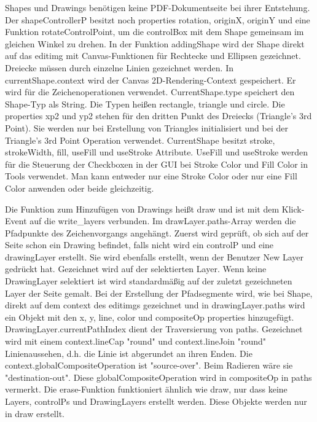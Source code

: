\par
Shapes und Drawings benötigen keine PDF-Dokumentseite bei ihrer Entstehung. Der shapeControllerP besitzt noch properties rotation, originX, originY und eine Funktion rotateControlPoint, um die controlBox mit dem Shape gemeinsam im gleichen Winkel zu drehen. In der Funktion addingShape wird der Shape direkt auf das editimg mit Canvas-Funktionen für Rechtecke und Ellipsen gezeichnet. Dreiecke müssen durch einzelne Linien gezeichnet werden. In currentShape.context wird der Canvas 2D-Rendering-Context gespeichert. Er wird für die Zeichenoperationen verwendet. CurrentShape.type speichert den Shape-Typ als String. Die Typen heißen rectangle, triangle und circle. Die properties xp2 und yp2 stehen für den dritten Punkt des Dreiecks (Triangle's 3rd Point). Sie werden nur bei Erstellung von Triangles initialisiert und bei der Triangle's 3rd Point Operation verwendet. CurrentShape besitzt stroke, strokeWidth, fill, useFill und useStroke Attribute. UseFill und useStroke werden für die Steuerung der Checkboxen in der GUI bei Stroke Color und Fill Color in Tools verwendet. Man kann entweder nur eine Stroke Color oder nur eine Fill Color anwenden oder beide gleichzeitig. 
\par 
Die Funktion zum Hinzufügen von Drawings heißt draw und ist mit dem Klick-Event auf die write\_layers verbunden. Im drawLayer.paths-Array werden die Pfadpunkte des Zeichenvorgangs angehängt. Zuerst wird geprüft, ob sich auf der Seite schon ein Drawing befindet, falls nicht wird ein controlP und eine drawingLayer erstellt. Sie wird ebenfalls erstellt, wenn der Benutzer New Layer gedrückt hat. Gezeichnet wird auf der selektierten Layer. Wenn keine DrawingLayer selektiert ist wird standardmäßig auf der zuletzt gezeichneten Layer der Seite gemalt. Bei der Erstellung der Pfadsegmente wird, wie bei Shape, direkt auf dem context des editimgs gezeichnet und in drawingLayer.paths wird ein Objekt mit den x, y, line, color und compositeOp properties hinzugefügt. DrawingLayer.currentPathIndex dient der Traversierung von paths. Gezeichnet wird mit einem context.lineCap "round" und context.lineJoin "round" Linienaussehen, d.h. die Linie ist abgerundet an ihren Enden. Die context.globalCompositeOperation ist "source-over". Beim Radieren wäre sie "destination-out". Diese globalCompositeOperation wird in compositeOp in paths vermerkt. Die erase-Funktion funktioniert ähnlich wie draw, nur dass keine Layers, controlPs und DrawingLayers erstellt werden. Diese Objekte werden nur in draw erstellt.


